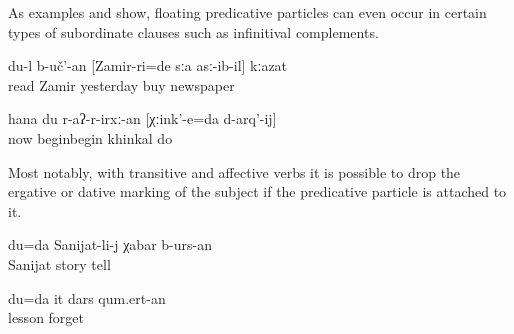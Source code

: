 As examples  and  show, floating predicative particles can even occur in certain types of subordinate clauses such as infinitival complements.
%
\begin{exe}
	\ex	\label{ex:I had to read the newspaper that ZAMIR bought yesterday@25a}
	\gll	du-l	b-uč'-an	[Zamir-ri=de	sːa	asː-ib-il]	kːazat\\
			read	Zamir	yesterday	buy	newspaper\\
	\glt	{}

	\ex	\label{ex:Now I will / have to start to make KHINKAL@6}
	\gll	hana	du	r-aʔ-r-irxː-an	[χːink'-e=da	d-arq'-ij]\\
		now		beginbegin	khinkal	do\\
	\glt	{}
\end{exe}

Most notably, with transitive and affective verbs it is possible to drop the ergative or dative marking of the subject if the predicative particle is attached to it.
%
\begin{exe}
	\ex	\label{ex:I will / have to tell Sanijat the story@8a}
	\gll	du=da	Sanijat-li-j	χabar	b-urs-an\\
			Sanijat	story	tell\\
	\glt	{}

	\ex	\label{ex:I will not forget this lesson@8b}
	\gll	du=da	it	dars	qum.ert-an\\
				lesson	forget\\
	\glt	{}
\end{exe}

